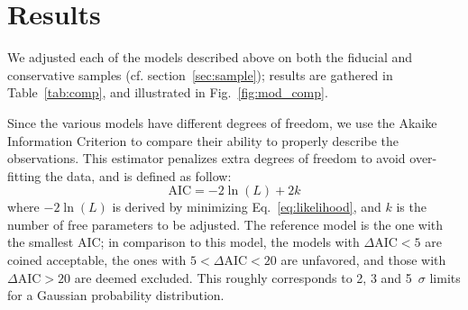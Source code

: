 \documentclass[]{aa} %
\newcommand{\mr}[1]{{\textcolor[rgb]{0.60,0.10,0.6}{#1}}}
\begin{document}
\section{Results}\label{sec:results}

We adjusted each of the models described above on both the fiducial and
conservative samples (cf. section~\ref{sec:sample}); results are gathered
in Table~\ref{tab:comp}, and illustrated in Fig.~\ref{fig:mod_comp}. 

Since the various models have different degrees of freedom, we use the Akaike
Information Criterion \citep[AIC, e.g.][]{burnham2004} to compare their ability
to properly describe the observations. This estimator penalizes extra degrees of
freedom to avoid over-fitting the data, and is defined as follow:
\begin{equation}
    \mathrm{AIC} = -2\ln(L) + 2k
\end{equation}
where $-2\ln(L)$ \mr{is derived by minimizing} Eq.~\eqref{eq:likelihood}, and $k$ is the number of free parameters to be
adjusted. The reference model is the one with the smallest AIC; in comparison to
this model, the models with $\Delta\mathrm{AIC}<5$ are coined acceptable,
the ones with $5<\Delta\mathrm{AIC}<20$ are unfavored, and those with
$\Delta\mathrm{AIC}>20$ are deemed excluded. This roughly corresponds to 2,
3 and 5~$\sigma$ limits for a Gaussian probability distribution.
\end{document}
